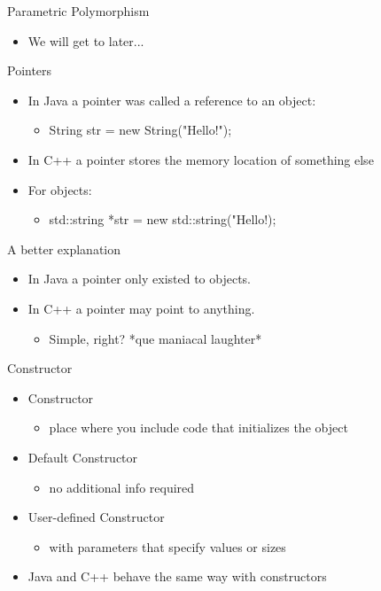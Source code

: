 \documentclass{beamer}
\begin{document}
\begin{frame}{Parametric Polymorphism}
\begin{itemize}
\item We will get to later...
\end{itemize}
\end{frame}

\begin{frame}{Pointers}
\begin{itemize}
\item In Java a pointer was called a reference to an object:
\begin{itemize}
\item String str = new String("Hello!");
\end{itemize}
\item In C++ a pointer stores the memory location of something else
\item For objects:
\begin{itemize}
\item std::string *str = new std::string("Hello!);
\end{itemize}
\end{itemize}
\end{frame}

\begin{frame}{A better explanation}
\begin{itemize}
\item In Java a pointer only existed to objects.
\item In C++ a pointer may point to anything.
\begin{itemize}
\item <2->Simple, right?  *que maniacal laughter*
\end{itemize}
\end{itemize}
\end{frame}

\begin{frame}{Constructor}
\begin{itemize}
\item Constructor
\begin{itemize}
\item place where you include code that initializes the object
\end{itemize}
\item Default Constructor
\begin{itemize}
\item no additional info required
\end{itemize}
\item User-defined Constructor
\begin{itemize}
\item with parameters that specify values or sizes
\end{itemize}
\item Java and C++ behave the same way with constructors
\end{itemize}
\end{frame}
\end{document}
